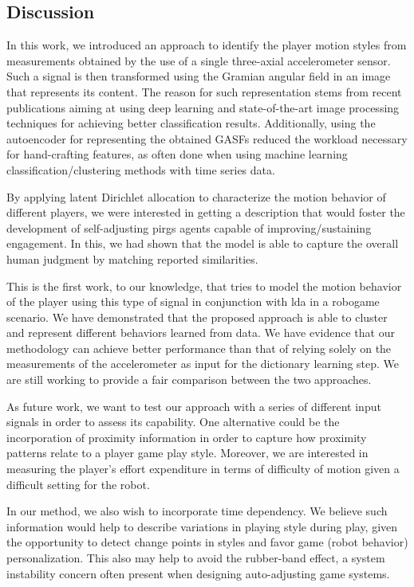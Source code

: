 \subsection{Discussion}
In this work, we introduced an approach to identify the player motion styles from measurements obtained by the use of a single three-axial accelerometer sensor. Such a signal is then transformed using the Gramian angular field in an image that represents its content. The reason for such representation stems from recent publications aiming at using deep learning and state-of-the-art image processing techniques for achieving better classification results. Additionally, using the autoencoder for representing the obtained GASFs reduced the workload necessary for hand-crafting features, as often done when using machine learning classification/clustering methods with time series data.

By applying latent Dirichlet allocation to characterize the motion behavior of different players, we were interested in getting a description that would foster the development of self-adjusting \gls{pirg}s agents capable of improving/sustaining engagement. In this, we had shown that the model is able to capture the overall human judgment by matching reported similarities. 

This is the first work, to our knowledge, that tries to model the motion behavior of the player using this type of signal in conjunction with \gls{lda} in a robogame scenario. We have demonstrated that the proposed approach is able to cluster and represent different behaviors learned from data. We have evidence that our methodology can achieve better performance than that of relying solely on the measurements of the accelerometer as input for the dictionary learning step. We are still working to provide a fair comparison between the two approaches.%

As future work, we want to test our approach with a series of different input signals in order to assess its capability. One alternative could be the incorporation of proximity information in order to capture how proximity patterns relate to a player game play style. Moreover, we are interested in measuring the player's effort expenditure in terms of difficulty of motion given a difficult setting for the robot. 

In our method, we also wish to incorporate time dependency. We believe such information would help to describe variations in playing style during play, given the opportunity to detect change points in styles and favor game (robot behavior) personalization. This also may help to avoid the rubber-band effect, a system instability concern often present when designing auto-adjusting game systems.

